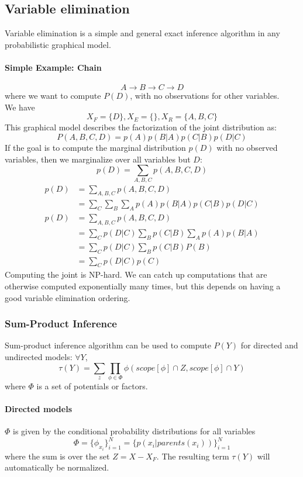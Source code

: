 \documentclass[11pt]{article}
\begin{document}
\subsection{Variable elimination}
Variable elimination is a simple and general exact inference algorithm in any probabilistic graphical model.

\paragraph{Simple Example: Chain}
$$ A \rightarrow B \rightarrow C \rightarrow D$$
where we want to compute $P(D)$, with no observations for other variables. \\
We have
$$X_F = \{D\}, X_E = \{\}, X_R = \{A,B,C\}$$
This graphical model describes the factorization of the joint distribution as:
$$P(A,B,C,D) = p(A)p(B|A)p(C|B)p(D|C)$$
If the goal is to compute the marginal distribution $p(D)$ with no observed variables, then we marginalize over all variables but $D$:
$$p(D) = \sum_{A,B,C} p(A,B,C,D)$$
\begin{align*}
	p(D) &= \sum_{A,B,C} p(A,B,C,D) \\
	&= \sum_C \sum_B \sum_A p(A)p(B|A)p(C|B)p(D|C)
\end{align*}
\begin{align*}
	p(D) &= \sum_{A,B,C} p(A,B,C,D) \\
	&= \sum_C p(D|C)\sum_B p(C|B) \sum_A p(A)p(B|A)\\
	&= \sum_C p(D|C)\sum_B p(C|B)P(B)\\
	&= \sum_C p(D|C)p(C)
\end{align*}
\remark
Computing the joint is NP-hard. We can catch up computations that are otherwise computed exponentially many times, but this depends on having a good variable elimination ordering.

\subsubsection{Sum-Product Inference}
Sum-product inference algorithm can be used to compute $P(Y)$ for directed and undirected models: $\forall Y$,
$$\tau(Y) = \sum_z \prod_{\phi \in \Phi} \phi(scope[\phi]\cap Z, scope[\phi]\cap Y)$$
where $\Phi$ is a set of potentials or factors.
\paragraph{Directed models}
$\Phi$ is given by the conditional probability distributions for all variables
$$\Phi = \{\phi_{x_i}\}_{i=1}^N = \{p(x_i|parents(x_i))\}_{i=1}^N$$
where the sum is over the set $Z = X - X_F$. The resulting term $\tau(Y)$ will automatically be normalized.
\end{document}

